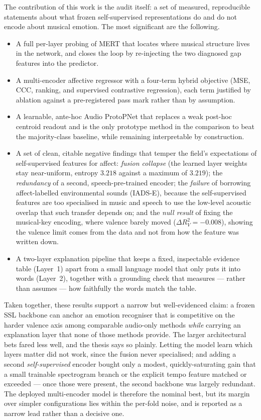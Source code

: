 \documentclass[12pt]{report}
\begin{document}
The contribution of this work is the audit itself: a set of measured, reproducible statements about what frozen self-supervised representations do and do not encode about musical emotion. The most significant are the following.

\begin{itemize}
    \item A full per-layer probing of MERT that locates where musical structure lives in the network, and closes the loop by re-injecting the two diagnosed gap features into the predictor.
    \item A multi-encoder affective regressor with a four-term hybrid objective (MSE, CCC, ranking, and supervised contrastive regression), each term justified by ablation against a pre-registered pass mark rather than by assumption.
    \item A learnable, ante-hoc Audio ProtoPNet that replaces a weak post-hoc centroid readout and is the only prototype method in the comparison to beat the majority-class baseline, while remaining interpretable by construction.
    \item A set of clean, citable negative findings that temper the field's expectations of self-supervised features for affect: \emph{fusion collapse} (the learned layer weights stay near-uniform, entropy $3.218$ against a maximum of $3.219$); the \emph{redundancy} of a second, speech-pre-trained encoder; the \emph{failure} of borrowing affect-labelled environmental sounds (IADS-E), because the self-supervised features are too specialised in music and speech to use the low-level acoustic overlap that such transfer depends on; and the \emph{null result} of fixing the musical-key encoding, where valence barely moved ($\Delta R^{2}_{V}=-0.008$), showing the valence limit comes from the data and not from how the feature was written down.
    \item A two-layer explanation pipeline that keeps a fixed, inspectable evidence table (Layer~1) apart from a small language model that only puts it into words (Layer~2), together with a grounding check that measures --- rather than assumes --- how faithfully the words match the table.
\end{itemize}

Taken together, these results support a narrow but well-evidenced claim: a frozen SSL backbone can anchor an emotion recogniser that is competitive on the harder valence axis among comparable audio-only methods \emph{while} carrying an explanation layer that none of those methods provide. The larger architectural bets fared less well, and the thesis says so plainly. Letting the model learn which layers matter did not work, since the fusion never specialised; and adding a second \emph{self-supervised} encoder bought only a modest, quickly-saturating gain that a small trainable spectrogram branch or the explicit tempo feature matched or exceeded --- once those were present, the second backbone was largely redundant. The deployed multi-encoder model is therefore the nominal best, but its margin over simpler configurations lies within the per-fold noise, and is reported as a narrow lead rather than a decisive one.
\end{document}
